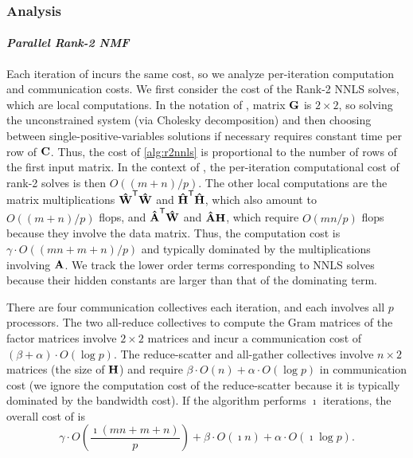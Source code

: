 \documentclass[conference,compsoc]{IEEEtran}
\begin{document}
\subsubsection{Analysis}
\label{sec:analysis}

\paragraph{\emph{Parallel Rank-2 NMF}}

Each iteration of  incurs the same cost, so we analyze per-iteration computation and communication costs.
We first consider the cost of the Rank-2 NNLS solves, which are local computations.
In the notation of , matrix $\M{G}$ is $2\times 2$, so solving the unconstrained system (via Cholesky decomposition) and then choosing between single-positive-variables solutions if necessary requires constant time per row of $\M{C}$.
Thus, the cost of \cref{alg:r2nnls} is proportional to the number of rows of the first input matrix.
In the context of , the per-iteration computational cost of rank-2 solves is then $O((m+n)/p)$.
The other local computations are the matrix multiplications $\M[\hat]{W}^\Tra \M[\hat]{W}$ and $\M[\hat]{H}^\Tra \M[\hat]{H}$, which also amount to $O((m+n)/p)$ flops, and $\M[\hat]{A}^\Tra \M[\hat]{W}$ and $\M[\hat]{A} \M{H}$, which require $O(mn/p)$ flops because they involve the data matrix.
Thus, the computation cost is $\gamma \cdot O((mn+m+n)/p)$ and typically dominated by the multiplications involving $\M{A}$.
We track the lower order terms corresponding to NNLS solves because their hidden constants are larger than that of the dominating term.

There are four communication collectives each iteration, and each involves all $p$ processors.
The two all-reduce collectives to compute the Gram matrices of the factor matrices involve $2\times 2$ matrices and incur a communication cost of $(\beta + \alpha) \cdot O(\log p)$.
The reduce-scatter and all-gather collectives involve $n\times 2$ matrices (the size of $\M{H}$) and require $\beta \cdot O(n) + \alpha \cdot O(\log p)$ in communication cost (we ignore the computation cost of the reduce-scatter because it is typically dominated by the bandwidth cost).
If the algorithm performs $\imath$ iterations, the overall cost of  is
\begin{equation}
\label{eq:r2nmfcost}
\gamma \cdot O\left( \frac{\imath (mn+m+n)}{p} \right) + \beta \cdot O(\imath n) + \alpha \cdot O(\imath \log p).
\end{equation}
\end{document}
